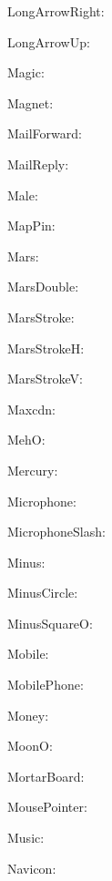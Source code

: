 \documentclass{article}
\begin{document}
      LongArrowRight: \faLongArrowRight\ 

      LongArrowUp: \faLongArrowUp\ 

      Magic: \faMagic\ 

      Magnet: \faMagnet\ 

      MailForward: \faMailForward\ 

      MailReply: \faMailReply\ 

      Male: \faMale\ 

      MapPin: \faMapPin\ 

      Mars: \faMars\ 

      MarsDouble: \faMarsDouble\ 

      MarsStroke: \faMarsStroke\ 

      MarsStrokeH: \faMarsStrokeH\ 

      MarsStrokeV: \faMarsStrokeV\ 

      Maxcdn: \faMaxcdn\ 

      MehO: \faMehO\ 

      Mercury: \faMercury\ 

      Microphone: \faMicrophone\ 

      MicrophoneSlash: \faMicrophoneSlash\ 

      Minus: \faMinus\ 

      MinusCircle: \faMinusCircle\ 

      MinusSquareO: \faMinusSquareO\ 

      Mobile: \faMobile\ 

      MobilePhone: \faMobilePhone\ 

      Money: \faMoney\ 

      MoonO: \faMoonO\ 

      MortarBoard: \faMortarBoard\ 

      MousePointer: \faMousePointer\ 

      Music: \faMusic\ 

      Navicon: \faNavicon\ 
\end{document}
